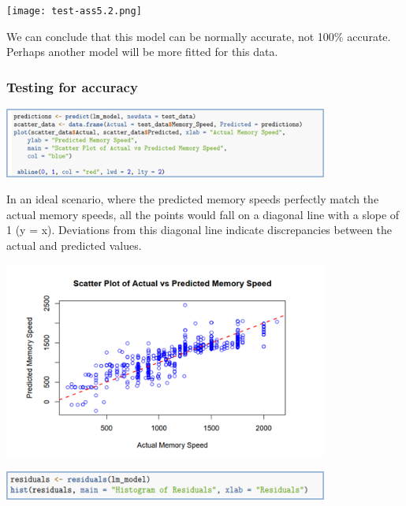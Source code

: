 \begin{center}
    \texttt{[image: test-ass5.2.png]}
\end{center}

\tab We can conclude that this model can be normally accurate, not 100\% accurate. Perhaps another model will be more fitted for this data. 

\subsubsection{Testing for accuracy}

\begin{center}
    \includegraphics[width=0.8\textwidth]{test-accuracy1.png}
\end{center}

\tab In an ideal scenario, where the predicted memory speeds perfectly match the actual memory speeds, all the points would fall on a diagonal line with a slope of 1 (y = x). Deviations from this diagonal line indicate discrepancies between the actual and predicted values.  

\begin{center}
    \includegraphics[width=0.8\textwidth]{test-accuracy2.png}
\end{center}

\begin{center}
    \includegraphics[width=0.8\textwidth]{test-accuracy3.png}
\end{center}

